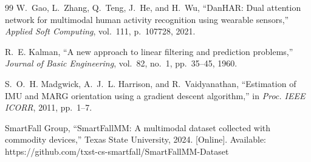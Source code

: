 \documentclass[journal,12pt]{IEEEtran}
\begin{document}
\begin{thebibliography}{99}
W.~Gao, L.~Zhang, Q.~Teng, J.~He, and H.~Wu, ``DanHAR: Dual attention network for multimodal human activity recognition using wearable sensors,'' \textit{Applied Soft Computing}, vol.~111, p.~107728, 2021.

R.~E. Kalman, ``A new approach to linear filtering and prediction problems,'' \textit{Journal of Basic Engineering}, vol.~82, no.~1, pp.~35--45, 1960.

S.~O.~H. Madgwick, A.~J.~L. Harrison, and R.~Vaidyanathan, ``Estimation of IMU and MARG orientation using a gradient descent algorithm,'' in \textit{Proc. IEEE ICORR}, 2011, pp.~1--7.

SmartFall Group, ``SmartFallMM: A multimodal dataset collected with commodity devices,'' Texas State University, 2024. [Online]. Available: https://github.com/txst-cs-smartfall/SmartFallMM-Dataset

\end{thebibliography}

\end{document}

